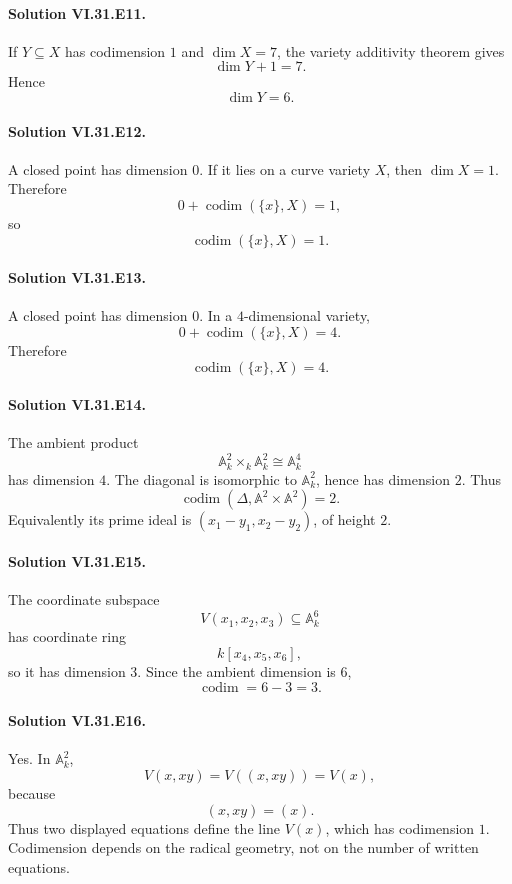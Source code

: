 \paragraph{Solution VI.31.E11.}
If \(Y\subseteq X\) has codimension \(1\) and \(\dim X=7\), the variety additivity theorem gives
\[
\dim Y+1=7.
\]
Hence
\[
\boxed{\dim Y=6}.
\]

\paragraph{Solution VI.31.E12.}
A closed point has dimension \(0\).  If it lies on a curve variety \(X\), then \(\dim X=1\).  Therefore
\[
0+\operatorname{codim}(\{x\},X)=1,
\]
so
\[
\boxed{\operatorname{codim}(\{x\},X)=1}.
\]

\paragraph{Solution VI.31.E13.}
A closed point has dimension \(0\).  In a \(4\)-dimensional variety,
\[
0+\operatorname{codim}(\{x\},X)=4.
\]
Therefore
\[
\boxed{\operatorname{codim}(\{x\},X)=4}.
\]

\paragraph{Solution VI.31.E14.}
The ambient product
\[
\mathbb A^2_k\times_k\mathbb A^2_k\cong\mathbb A^4_k
\]
has dimension \(4\).  The diagonal is isomorphic to \(\mathbb A^2_k\), hence has dimension \(2\).  Thus
\[
\boxed{\operatorname{codim}(\Delta,\mathbb A^2\times\mathbb A^2)=2}.
\]
Equivalently its prime ideal is \((x_1-y_1,x_2-y_2)\), of height \(2\).

\paragraph{Solution VI.31.E15.}
The coordinate subspace
\[
V(x_1,x_2,x_3)\subseteq\mathbb A^6_k
\]
has coordinate ring
\[
k[x_4,x_5,x_6],
\]
so it has dimension \(3\).  Since the ambient dimension is \(6\),
\[
\boxed{\operatorname{codim}=6-3=3}.
\]

\paragraph{Solution VI.31.E16.}
Yes.  In \(\mathbb A^2_k\),
\[
V(x,xy)=V((x,xy))=V(x),
\]
because
\[
(x,xy)=(x).
\]
Thus two displayed equations define the line \(V(x)\), which has codimension \(1\).  Codimension depends on the
radical geometry, not on the number of written equations.

